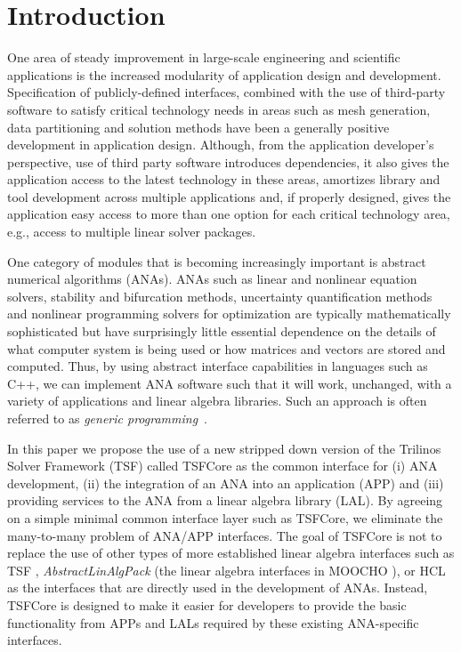 \documentclass[10pt,fleqn]{article}
\begin{document}
\section{Introduction}

One area of steady improvement in large-scale engineering 
and scientific applications is the increased modularity of application
design and development.  Specification of publicly-defined interfaces,
combined with the use of third-party software
to satisfy critical technology needs in areas 
such as mesh generation, data 
partitioning and solution methods have been a 
generally positive development in application design.  Although, 
from the application 
developer's perspective, use of third party software introduces 
dependencies, it also gives the application access to the latest
technology in these areas, amortizes library and tool development
across multiple applications and, if properly designed, gives the
application easy access to more than one option for each critical
technology area, e.g., access to multiple linear solver packages.

One category of modules that is becoming
increasingly important is abstract numerical algorithms (ANAs).  ANAs
such as linear and nonlinear equation solvers,
stability and bifurcation methods,
uncertainty quantification methods and nonlinear programming solvers
for optimization are typically mathematically 
sophisticated but have surprisingly little essential dependence on the
details of what computer system is being used or how matrices and
vectors are stored and computed.  Thus, by using abstract
interface capabilities in languages such as C++, we can implement ANA
software such that it will work, unchanged, with a variety of
applications and linear algebra libraries.  Such an approach is often
referred to as {\it generic programming}~\cite{ref:boost_generic_programming}.

In this paper we propose the use of a new stripped
down version of the Trilinos Solver Framework (TSF) called TSFCore as
the common interface for (i) ANA development, (ii) the integration of an
ANA into an application (APP) and (iii) providing services to the ANA
from a linear algebra library (LAL).  By agreeing on a simple minimal
common interface layer such as TSFCore, we eliminate the many-to-many
problem of ANA/APP interfaces.  The goal of TSFCore is not to
replace the use of other types of more established linear algebra
interfaces such as TSF \cite{ref:TSF}, \textit{AbstractLinAlgPack}
(the linear algebra interfaces in MOOCHO \cite{ref:moochouserguide}),
or HCL \cite{ref:hcl} as the interfaces that are directly used in the
development of ANAs.  Instead, TSFCore is designed to make it easier
for developers to provide the basic functionality from APPs and LALs
required by these existing ANA-specific interfaces.  
\end{document}
